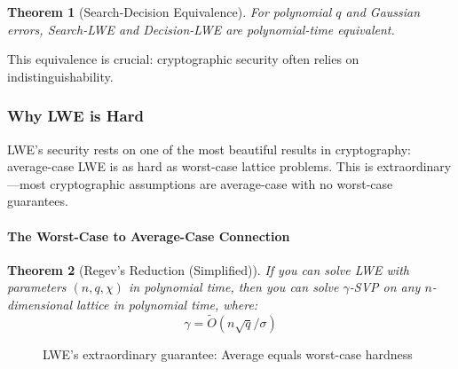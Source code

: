 \documentclass[11pt,a4paper]{article}
\newtheorem{theorem}{Theorem}
\begin{document}
\begin{theorem}[Search-Decision Equivalence]
For polynomial $q$ and Gaussian errors, Search-LWE and Decision-LWE are polynomial-time equivalent.
\end{theorem}

This equivalence is crucial: cryptographic security often relies on indistinguishability.

\subsubsection{Why LWE is Hard}

LWE's security rests on one of the most beautiful results in cryptography: average-case LWE is as hard as worst-case lattice problems. This is extraordinary—most cryptographic assumptions are average-case with no worst-case guarantees.

\paragraph{The Worst-Case to Average-Case Connection}

\begin{theorem}[Regev's Reduction (Simplified)]
If you can solve LWE with parameters $(n, q, \chi)$ in polynomial time, then you can solve $\gamma$-SVP on any $n$-dimensional lattice in polynomial time, where:
$$\gamma = \tilde{O}(n\sqrt{q}/\sigma)$$
\end{theorem}

\begin{figure}[h]
\centering
{}
\caption{LWE's extraordinary guarantee: Average equals worst-case hardness}
\end{figure}
\end{document}
